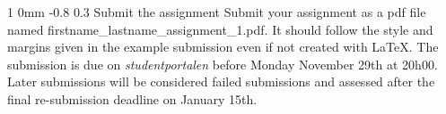 \documentclass[11pt]{article}
\makeatletter
\renewcommand{\section}{\@startsection
{section}%
{1}%
{0mm}%
{-0.8\baselineskip}%
{0.3\baselineskip}%
{\bfseries\large}}%
\makeatother
\begin{document}
\section{Submit the assignment}
\noindent
Submit your assignment as a pdf file named
firstname\_lastname\_assignment\_1.pdf. It should follow the style and
margins given in the example submission even if not created with
LaTeX. The submission is due on \textit{studentportalen} before Monday
November 29th at 20h00. Later submissions will be considered failed
submissions and assessed after the final re-submission deadline on
January 15th.
\end{document}
